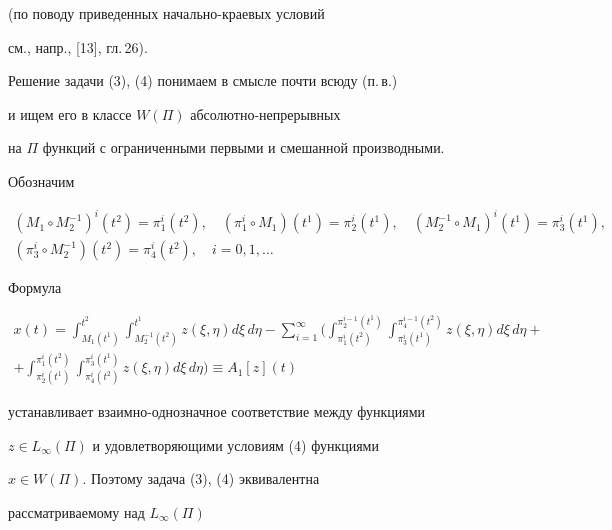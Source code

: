 (по поводу приведенных начально-краевых условий


см., напр., [13], гл.\,26).





Решение задачи (3), (4) понимаем в смысле почти всюду (п.\,в.)


и ищем его в классе $W(\Pi)$ абсолютно-непрерывных


на $\Pi$ функций с ограниченными первыми и смешанной производными.


Обозначим


\begin{gather*}


(M_1{\circ} M^{-1}_2)^i(t^2)={\pi}^i_1(t^2),\quad


({\pi}^i_1{\circ} M_1)(t^1)={\pi}^i_2(t^1),\quad


(M^{-1}_2{\circ} M_1)^i(t^1)={\pi}^i_3(t^1), \\


%


({\pi}^i_3{\circ} M^{-1}_2)(t^2)={\pi}^i_4(t^2),\quad i=0,1,\dotsc 


\end{gather*}





Формула


\begin{multline*}


x(t)=\int^{t^2}_{M_1(t^1)}\int^{t^1}_{M^{-1}_2(t^2)}z(\xi,\eta)d\xi\, d\eta


-\sum^{\infty}_{i=1}\bigg(\int^{{\pi}^{i-1}_2(t^1)}_{{\pi}^i_1(t^2)}


\int^{{\pi}^{i-1}_4(t^2)}_{{\pi}^i_3(t^1)}z(\xi,\eta)d\xi\, d\eta +\\


%


+\int^{{\pi}^i_1(t^2)}_{{\pi}^i_2(t^1)}\int^{{\pi}^i_3(t^1)}_


{{\pi}^i_4(t^2)}z(\xi,\eta)d\xi\, d\eta \bigg)\equiv A_1[z](t)


\end{multline*}


устанавливает взаимно-однозначное соответствие между функциями


$z\in L_{\infty}(\Pi)$ и удовлетворяющими условиям (4) функциями


$x\in W(\Pi)$. Поэтому задача (3), (4) эквивалентна


рассматриваемому над $L_{\infty}(\Pi)$


